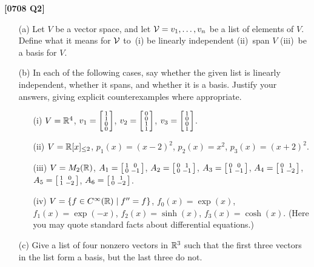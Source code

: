 \documentclass[a4paper]{article}
\begin{document}
\begin{problem}\textbf{[0708 Q2]}
 \begin{itemize}
  \item[(a)] Let $V$ be a vector space, and let $\mathcal{V}=v_1,\dotsc,v_n$
   be a list of elements of $V$.  Define what it means for $\mathcal{V}$
   to~(i) be linearly independent (ii)~span $V$ (iii)~be a basis for
   $V$.  
  \item[(b)] In each of the following cases, say whether the given
   list is linearly independent, whether it spans, and whether it is a
   basis.  Justify your answers, giving explicit counterexamples where
   appropriate.  
   \begin{itemize}
    \item[(i)] $V={\mathbb{R}}^4$,
     $v_1=\left[\begin{smallmatrix} 1\\1\\0\\0 \end{smallmatrix}\right]$,
     $v_2=\left[\begin{smallmatrix} 0\\0\\1\\1 \end{smallmatrix}\right]$,
     $v_3=\left[\begin{smallmatrix} 1\\0\\0\\1 \end{smallmatrix}\right]$.
    \item[(ii)] $V={\mathbb{R}}[x]_{\leq 2}$, $p_1(x)=(x-2)^2$, $p_2(x)=x^2$,
     $p_3(x)=(x+2)^2$.
    \item[(iii)] $V=M_2({\mathbb{R}})$, 
     $A_1 = \left[\begin{smallmatrix} 1 & 0 \\ 0 & -1\end{smallmatrix}\right]$,
     $A_2 = \left[\begin{smallmatrix} 0 & 1 \\ 0 & -1\end{smallmatrix}\right]$,
     $A_3 = \left[\begin{smallmatrix} 0 & 0 \\ 1 & -1\end{smallmatrix}\right]$,
     $A_4 = \left[\begin{smallmatrix} 0 & 1 \\ 1 & -2\end{smallmatrix}\right]$,
     $A_5 = \left[\begin{smallmatrix} 1 & 0 \\ 1 & -2\end{smallmatrix}\right]$,
     $A_6 = \left[\begin{smallmatrix} 1 & 1 \\ 0 & -2\end{smallmatrix}\right]$.
    \item[(iv)] $V=\{ f\in C^\infty({\mathbb{R}})\;|\; f''=f \}$,
     $f_0(x)=\exp(x)$, $f_1(x)=\exp(-x)$,
     $f_2(x)=\sinh(x)$, $f_3(x)=\cosh(x)$.  (Here you may quote
     standard facts about differential equations.)
   \end{itemize}
  \item[(c)] Give a list of four nonzero vectors in ${\mathbb{R}}^3$ such that
   the first three vectors in the list form a basis, but the last
   three do not. 
 \end{itemize}
\end{problem}
\end{document}
